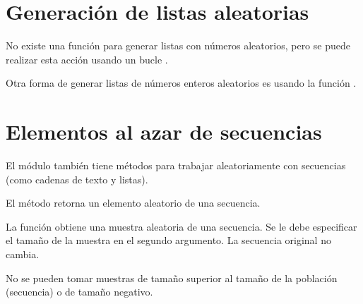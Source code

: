 

\section{Generación de listas aleatorias}

No existe una función para generar listas con números aleatorios, pero se puede realizar esta acción usando un bucle .



Otra forma de generar listas de números enteros aleatorios es usando la función .


\section{Elementos al azar de secuencias}

El módulo  también tiene métodos para trabajar aleatoriamente con secuencias (como cadenas de texto y listas).\smallskip

El método  retorna un elemento aleatorio de una secuencia.



La función  obtiene una muestra aleatoria de una secuencia. Se le debe especificar el tamaño de la muestra en el segundo argumento. La secuencia original no cambia.


No se pueden tomar muestras de tamaño superior al tamaño de la población (secuencia) o de tamaño negativo.



